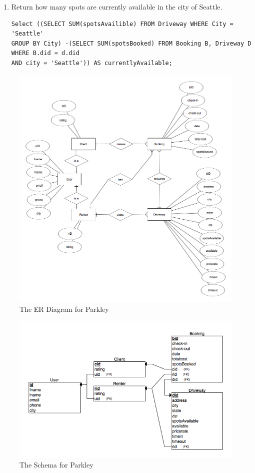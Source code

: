 \documentclass[a4paper]{article}
\begin{document}
\begin{enumerate}
\begin{enumerate}
\item Return how many spots are currently available in the city of Seattle.

\begin{verbatim}
Select ((SELECT SUM(spotsAvailible) FROM Driveway WHERE City = 'Seattle' 
GROUP BY City) -(SELECT SUM(spotsBooked) FROM Booking B, Driveway D WHERE B.did = d.did
AND city = 'Seattle')) AS currentlyAvailable;
\end{verbatim}

\end{enumerate}
\end{enumerate}

\begin{figure}
\includegraphics[scale=0.45]{parkley-erd.png}
\caption{\label{fig:erd}The ER Diagram for Parkley}
\end{figure}

\begin{figure}
\includegraphics[scale=0.5]{parkley-schema.png}
\caption{\label{fig:schema} The Schema for Parkley}
\end{figure}
\end{document}

